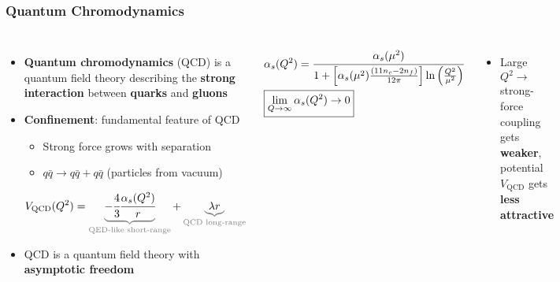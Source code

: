 \begin{frame}
  \frametitle{\textbf{Quantum Chromodynamics}}
  \begin{columns}
    \begin{itemize}
    \item \textbf{Quantum chromodynamics} (QCD) is a quantum field theory describing the \textbf{strong interaction} between \textbf{quarks} and \textbf{gluons}
    \item \textbf{Confinement}: fundamental feature of QCD
      \begin{itemize}
      \item Strong force grows with separation
      \item $q\bar{q} \to q\bar{q} + q\bar{q}$ (particles from vacuum)
      \end{itemize}
      \begin{align*}
        V_{\text{QCD}}(Q^2) = \color{gray}\underbrace{\color{black}-\cfrac{4}{3}\cfrac{\alpha_s(Q^2)}{r}}_{\text{QED-like short-range}} \color{black} + \color{gray} \underbrace{\color{black}\lambda r}_{\text{QCD long-range}}
      \end{align*}
    \item QCD is a quantum field theory with \textbf{asymptotic freedom}
    \end{itemize}
    \begin{align*}
      &\alpha_s(Q^2) = \cfrac{\alpha_s(\mu^2)}{1 + \left[\alpha_s(\mu^2)\frac{(11n_c - 2n_f)}{12\pi}\right]\ln\left(\frac{Q^2}{\mu^2}\right)} \\
      & \boxed{\lim_{Q \to \infty}\alpha_s(Q^2) \to 0}
    \end{align*}

    \begin{itemize}
    \item Large $Q^2 \to$ strong-force coupling gets \textbf{weaker}, potential $V_{\text{QCD}}$ gets \textbf{less attractive}
    \end{itemize}



    \centering

    \


\end{columns}
\end{frame}
